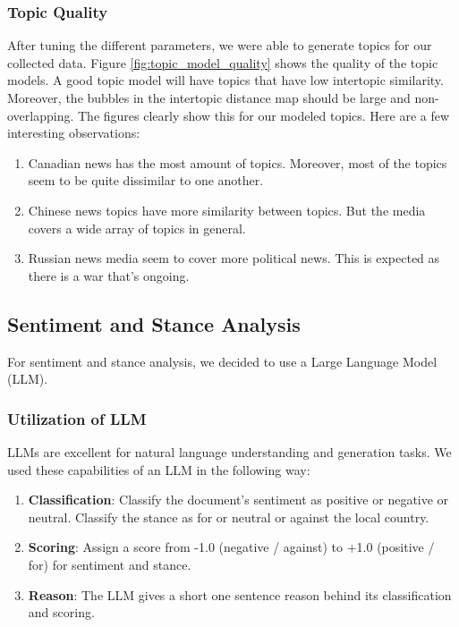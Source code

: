 \documentclass{article}
\theoremstyle{mytheoremstyle}
\theoremstyle{mytheoremstyle}
\theoremstyle{myproblemstyle}
\begin{document}
    \subsubsection{Topic Quality}
    After tuning the different parameters, we were able to generate topics for our collected data. Figure \ref{fig:topic_model_quality} shows the quality of the topic models. A good topic model will have topics that have low intertopic similarity. Moreover, the bubbles in the intertopic distance map should be large and non-overlapping. The figures clearly show this for our modeled topics. Here are a few interesting observations:

    \begin{enumerate}
        \item Canadian news has the most amount of topics. Moreover, most of the topics seem to be quite dissimilar to one another.
        \item Chinese news topics have more similarity between topics. But the media covers a wide array of topics in general.
        \item Russian news media seem to cover more political news. This is expected as there is a war that's ongoing.
    \end{enumerate}

    \subsection{Sentiment and Stance Analysis}

    For sentiment and stance analysis, we decided to use a Large Language Model (LLM). 
    
    \subsubsection{Utilization of LLM}
    LLMs are excellent for natural language understanding and generation tasks. We used these capabilities of an LLM in the following way:

    \begin{enumerate}
        \item \textbf{Classification}: Classify the document's sentiment as positive or negative or neutral. Classify the stance as for or neutral or against the local country.
        \item \textbf{Scoring}: Assign a score from -1.0 (negative / against) to +1.0 (positive / for) for sentiment and stance.
        \item \textbf{Reason}: The LLM gives a short one sentence reason behind its classification and scoring.
    \end{enumerate}
\end{document}

